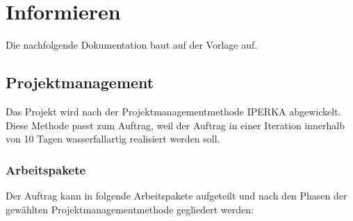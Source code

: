 \chapter{Informieren}

Die nachfolgende Dokumentation baut auf der Vorlage \cite{Buhler_ipa-template_2022} auf.

\section{Projektmanagement}

Das Projekt wird nach der Projektmanagementmethode IPERKA abgewickelt. Diese Methode passt zum Auftrag, weil der Auftrag in einer Iteration innerhalb von 10 Tagen wasserfallartig realisiert werden soll.

\subsection{Arbeitspakete}

Der Auftrag kann in folgende Arbeitspakete aufgeteilt und nach den Phasen der gewählten Projektmanagementmethode gegliedert werden:

